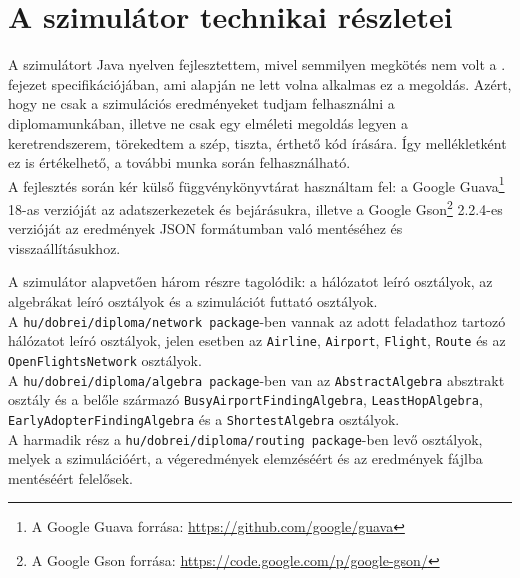  \section{A szimulátor technikai részletei}\label{sect:appendix_simulator}
  A szimulátort Java nyelven fejlesztettem, mivel semmilyen megkötés nem volt a . fejezet specifikációjában, ami alapján ne lett volna alkalmas ez a megoldás. Azért, hogy ne csak a szimulációs eredményeket tudjam felhasználni a diplomamunkában, illetve ne csak egy elméleti megoldás legyen a keretrendszerem, törekedtem a szép, tiszta, érthető kód írására. Így mellékletként ez is értékelhető, a további munka során felhasználható.\\

  A fejlesztés során kér külső függvénykönyvtárat használtam fel: a Google Guava\footnote{A Google Guava forrása: \href{https://github.com/google/guava}{https://github.com/google/guava}} 18-as verzióját az adatszerkezetek és bejárásukra, illetve a Google Gson\footnote{A Google Gson forrása: \href{https://code.google.com/p/google-gson/}{https://code.google.com/p/google-gson/}} 2.2.4-es verzióját az eredmények JSON formátumban való mentéséhez és visszaállításukhoz.

  A szimulátor alapvetően három részre tagolódik: a hálózatot leíró osztályok, az algebrákat leíró osztályok és a szimulációt futtató osztályok.\\

  A \texttt{hu/dobrei/diploma/network package}-ben vannak az adott feladathoz tartozó hálózatot leíró osztályok, jelen esetben az \texttt{Airline}, \texttt{Airport}, \texttt{Flight}, \texttt{Route} és az \texttt{OpenFlightsNetwork} osztályok.\\

  A \texttt{hu/dobrei/diploma/algebra package}-ben van az \texttt{AbstractAlgebra} absztrakt osztály és a belőle származó \texttt{BusyAirportFindingAlgebra}, \texttt{LeastHopAlgebra}, \texttt{EarlyAdopterFindingAlgebra} és a \texttt{ShortestAlgebra} osztályok.\\

  A harmadik rész a \texttt{hu/dobrei/diploma/routing package}-ben levő osztályok, melyek a szimulációért, a végeredmények elemzéséért és az eredmények fájlba mentéséért felelősek.\\

